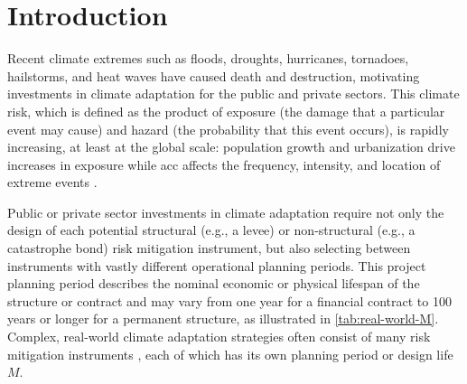 \documentclass[
]{agujournal2018}
\makeatletter
\newcommand{\eg}{e.g.\@\xspace}
\makeatother
\begin{document}

\section{Introduction}\label{sec:introduction}

Recent climate extremes such as floods, droughts, hurricanes, tornadoes, hailstorms, and heat waves have caused death and destruction, motivating investments in climate adaptation for the public and private sectors.
This climate risk, which is  defined as the product of exposure (the damage that a particular event may cause) and hazard (the probability that this event occurs), is rapidly increasing, at least at the global scale: population growth and urbanization drive increases in exposure \citep{Jongman:2012cr} while \gls{acc} affects the frequency, intensity, and location of extreme events \citep{IPCC:2012wt, Merz:2014gf, Shaw:2016bo}.

Public or private sector investments in climate adaptation require not only the design of each potential structural (\eg, a levee) or non-structural (\eg, a catastrophe bond) risk mitigation instrument, but also selecting between instruments with vastly different operational planning periods.
This project planning period describes the nominal economic or physical lifespan of the structure or contract and may vary from one year for  a financial contract to 100 years or longer for a permanent structure, as illustrated in \cref{tab:real-world-M}.
Complex, real-world climate adaptation strategies often consist of many risk mitigation instruments \citep[\eg,][]{CityofNewYork:2013uh}, each of which has its own planning period or design life $M$.
\end{document}
